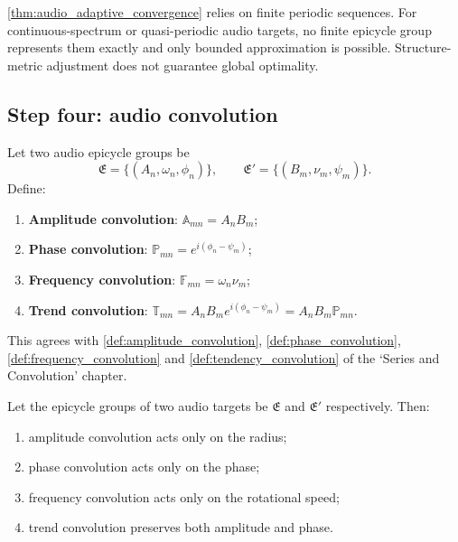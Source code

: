 \begin{remark}\label{rem:audio_adaptive_boundary}
\cref{thm:audio_adaptive_convergence} relies on finite periodic sequences. For continuous-spectrum or quasi-periodic audio targets, no finite epicycle group represents them exactly and only bounded approximation is possible. Structure-metric adjustment does not guarantee global optimality.
\end{remark}

\subsection{Step four: audio convolution}

\begin{definition}\label{def:audio_convolution_types}
Let two audio epicycle groups be
\[
\mathfrak E=\{(A_n,\omega_n,\phi_n)\},\qquad
\mathfrak E'=\{(B_m,\nu_m,\psi_m)\}.
\]
Define:
\begin{enumerate}[label=(\roman*)]
    \item \textbf{Amplitude convolution}: $\mathbb A_{mn}=A_nB_m$;
    \item \textbf{Phase convolution}: $\mathbb P_{mn}=e^{i(\phi_n-\psi_m)}$;
    \item \textbf{Frequency convolution}: $\mathbb F_{mn}=\omega_n\nu_m$;
    \item \textbf{Trend convolution}: $\mathbb T_{mn}=A_nB_m e^{i(\phi_n-\psi_m)}=A_nB_m\mathbb P_{mn}$.
\end{enumerate}
This agrees with \cref{def:amplitude_convolution}, \cref{def:phase_convolution}, \cref{def:frequency_convolution} and \cref{def:tendency_convolution} of the `Series and Convolution' chapter.
\end{definition}

\begin{theorem}\label{thm:audio_convolution_action}
Let the epicycle groups of two audio targets be $\mathfrak E$ and $\mathfrak E'$ respectively. Then:
\begin{enumerate}[label=(\roman*)]
    \item amplitude convolution acts only on the radius;
    \item phase convolution acts only on the phase;
    \item frequency convolution acts only on the rotational speed;
    \item trend convolution preserves both amplitude and phase.
\end{enumerate}
\end{theorem}

